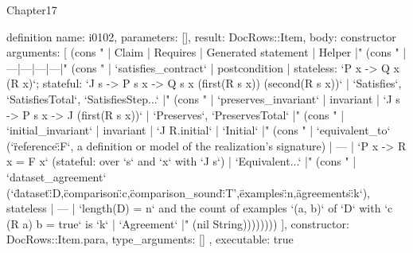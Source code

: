 \begin{lexlean}{Chapter17}
\begin{semanticmodule}
definition{
  name: i0102,
  parameters: [],
  result: DocRows::Item,
  body: constructor{
    arguments: [
      (cons "   | Claim | Requires | Generated statement | Helper |" (cons "   |---|---|---|---|" (cons "   | `satisfies_contract` | postcondition | stateless: `P x -> Q x (R x)`; stateful: `J s -> P s x -> Q s x (first(R s x)) (second(R s x))` | `Satisfies`, `SatisfiesTotal`, `SatisfiesStep...` |" (cons "   | `preserves_invariant` | invariant | `J s -> P s x -> J (first(R s x))` | `Preserves`, `PreservesTotal` |" (cons "   | `initial_invariant` | invariant | `J R.initial` | `Initial` |" (cons "   | `equivalent_to` (`\"reference\":F`, a definition or model of the realization's signature) | — | `P x -> R x = F x` (stateful: over `s` and `x` with `J s`) | `Equivalent...` |" (cons "   | `dataset_agreement` (`\"dataset\":D,\"comparison\":c,\"comparison_sound\":T',\"examples\":n,\"agreements\":k`), stateless | — | `length(D) = n` and the count of examples `(a, b)` of `D` with `c (R a) b = true` is `k` | `Agreement` |" (nil String))))))))
    ],
    constructor: DocRows::Item.para,
    type_arguments: []
  },
  executable: true
}


\end{semanticmodule}
\end{lexlean}
